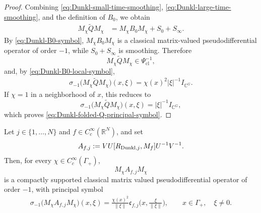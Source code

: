 \documentclass{amsart}
\begin{document}
\begin{proof}
Combining
\eqref{eq:Dunkl-small-time-smoothing},
\eqref{eq:Dunkl-large-time-smoothing}, and the definition of \(B_0\),
we obtain
\begin{align*}
M_\chi\widetilde Q M_\chi
&=
M_\chi B_0M_\chi
+
S_0
+
S_\infty.
\end{align*}
By \eqref{eq:Dunkl-B0-symbol},
\(M_\chi B_0M_\chi\) is a classical matrix-valued
pseudodifferential operator of order \(-1\), while
\(S_0+S_\infty\) is smoothing. Therefore
\[
M_\chi\widetilde Q M_\chi
\in
\Psi_{\mathrm{cl}}^{-1},
\]
and, by \eqref{eq:Dunkl-B0-local-symbol},
\begin{align*}
\sigma_{-1}
\bigl(
M_\chi\widetilde Q M_\chi
\bigr)(x,\xi)
=
\chi(x)^2|\xi|^{-1}I_{\mathbb C^G}.
\end{align*}
If \(\chi=1\) in a neighborhood of \(x\), this reduces to
\[
\sigma_{-1}
\bigl(
M_\chi\widetilde Q M_\chi
\bigr)(x,\xi)
=
|\xi|^{-1}I_{\mathbb C^G},
\]
which proves \eqref{eq:Dunkl-folded-Q-principal-symbol}.
\end{proof}

\begin{lemma}\label{lem:Dunkl-commutator-principal-symbol}
Let \(j\in\{1,\ldots,N\}\) and \(f\in C_c^\infty(\mathbb R^N)\), and set
\begin{align*}
A_{f,j}
:=
VU[R_{{\rm Dunkl},j},M_f]U^{-1}V^{-1}.
\end{align*}
Then, for every \(\chi\in C_c^\infty(\Gamma_+)\),
\[
M_\chi A_{f,j}M_\chi
\]
is a compactly supported classical matrix valued pseudodifferential
operator of order \(-1\), with principal symbol
\begin{align}
\sigma_{-1}
\big(
M_\chi A_{f,j}M_\chi
\big)(x,\xi)
=
\frac{\chi(x)^2}{\|\xi\|}
\mathfrak c_{f,j}
\bigg(
x,\frac{\xi}{\|\xi\|}
\bigg),
\qquad
x\in\Gamma_+,\quad \xi\neq0.
\label{eq:Dunkl-commutator-principal-symbol}
\end{align}
\end{lemma}
\end{document}
